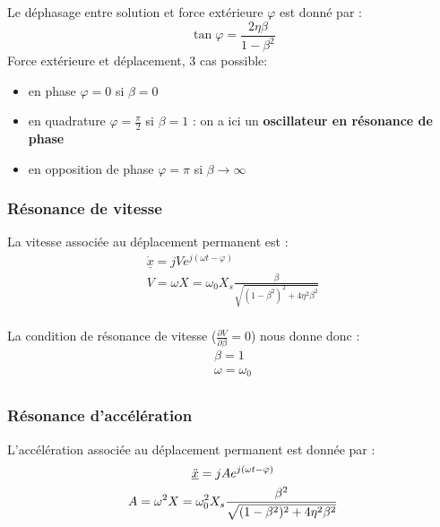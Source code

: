 \documentclass[../main.tex]{subfiles}
\begin{document}
Le déphasage entre solution et force extérieure $\varphi$ est donné par : \begin{equation}
    \tan \varphi = \frac{2\eta \beta}{1-\beta^2}
\end{equation}
Force extérieure et déplacement, 3 cas possible: \begin{itemize}
    \item en phase $\varphi = 0$ si $\beta=0$\\
    \item en quadrature $\varphi= \frac{\pi}{2}$ si $\beta=1$ : on a ici un \textbf{oscillateur en résonance de phase}\\
    \item en opposition de phase $\varphi=\pi$ si $\beta \rightarrow \infty$\\
\end{itemize}

\subsubsection{Résonance de vitesse}
La vitesse associée au déplacement permanent est : \begin{equation}\begin{gathered}
    \underline{\dot{x}} = j V e^{j(\omega t - \varphi)}\\
    V = \omega X = \omega_0 X_s \frac{\beta}{\sqrt{(1-\beta^2)^2 + 4\eta^2 \beta^2}}\\
    \end{gathered}
\end{equation}

La condition de résonance de vitesse ($\frac{\partial V}{\partial \beta} = 0$) nous donne donc : \begin{equation}
    \begin{gathered}
        \beta = 1\\
        \omega = \omega_0\\
    \end{gathered}
\end{equation}


\subsubsection{Résonance d'accélération}
L'accélération associée au déplacement permanent est donnée par : \begin{equation}\begin{gathered}
    \underline{\Ddot{x}} = jA e^{j(\omega t-\varphi)}\\
    A = \omega^2 X = \omega_0^2 X_s \frac{\beta^2}{\sqrt{(1-\beta^2)^2 + 4\eta^2 \beta^2}}\\
    \end{gathered}
\end{equation}
\end{document}
